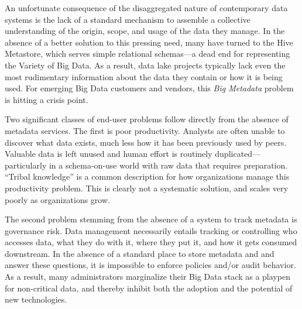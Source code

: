 \documentclass{sig-alternate}
\begin{document}
An unfortunate consequence of the disaggregated nature of contemporary data systems
is the lack of a standard mechanism
to assemble a collective understanding of the origin, scope, and usage of the data they manage.
In the absence of a better solution to this pressing need,
many have turned to the 
Hive Metastore, which serves simple relational schemas---a dead end for representing the Variety of Big Data. 
As a result, data lake projects typically lack 
even the most rudimentary information about the data they contain or how it is being used. 
For emerging Big Data customers and vendors, this \emph{Big Metadata} problem is hitting a crisis point.  

Two significant classes of end-user problems follow directly from the absence of metadata services.
The first is poor productivity.
Analysts are often unable to discover what data exists, much less how it has been previously used by peers. 
Valuable data is left unused
and human effort is routinely duplicated---particularly in a schema-on-use world with raw data that requires preparation.  
``Tribal knowledge'' is a common description for how organizations manage this productivity problem. 
This is clearly not a systematic solution, and scales very poorly as organizations grow.

The second problem 
stemming from the absence of a system to track metadata 
is governance risk. 
Data management necessarily entails tracking or controlling who accesses data, what they do with it, where they put it, and how it gets consumed downstream. 
In the absence of a standard place to store metadata and and answer these questions, it is impossible to enforce policies and/or audit behavior. 
As a result, many administrators marginalize their Big Data stack as a playpen for non-critical data, and thereby inhibit both the adoption and the potential of new technologies.
\end{document}
